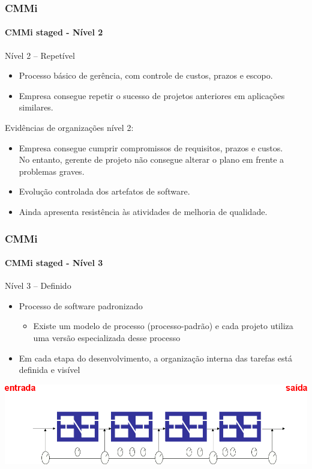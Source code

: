 \begin{frame}
	\frametitle{CMMi}
	\framesubtitle{CMMi staged - Nível 2}
	
	\begin{block:fact}{Nível 2 -- Repetível}
		\begin{itemize}
			\item Processo básico de gerência, com controle de custos, prazos e escopo.
			\item Empresa consegue repetir o sucesso de projetos anteriores em aplicações
			similares.
		\end{itemize}
	\end{block:fact}
	
	\begin{block:fact}{Evidências de organizações nível 2:}
		\begin{itemize}
			\item Empresa consegue cumprir compromissos de requisitos, prazos e custos.
			\\No entanto, gerente de projeto não consegue alterar o plano em frente a problemas
			graves.
			\item Evolução controlada dos artefatos de software.
			\item Ainda apresenta resistência às atividades de melhoria de qualidade.
		\end{itemize}
	\end{block:fact}
\end{frame}

\begin{frame}
	\frametitle{CMMi}
	\framesubtitle{CMMi staged - Nível 3}
	
	\begin{block:fact}{Nível 3 -- Definido}
		\begin{itemize}
			\item Processo de software padronizado
			\begin{itemize}
				\item Existe um modelo de processo (processo-padrão) e cada projeto
				utiliza uma versão especializada desse processo
			\end{itemize}
			\item Em cada etapa do desenvolvimento, a organização interna das tarefas
			está definida e visível
		\end{itemize}
	\end{block:fact}
	
	\begin{block:fact}{}
		\centering
		\includegraphics[width=\textwidth]{software-engineering/project-management/process/process-quality/cmmi/cmmi-staged-3}
	\end{block:fact}
\end{frame}

